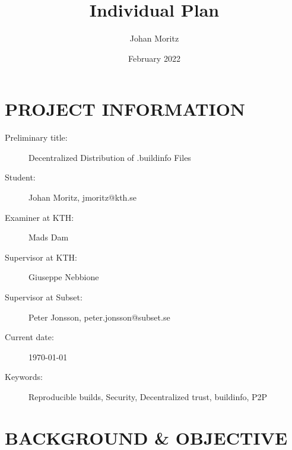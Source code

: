 \documentclass{article}
\title{Individual Plan}
\author{Johan Moritz}
\date{February 2022}
\begin{document}

\maketitle

\section*{PROJECT INFORMATION}

\begin{description}
	\item[Preliminary title:]  Decentralized Distribution of .buildinfo Files
	\item[Student:]  Johan Moritz, jmoritz@kth.se
	\item[Examiner at KTH:]  Mads Dam
	\item[Supervisor at KTH:]  Giuseppe Nebbione
	\item[Supervisor at Subset:]  Peter Jonsson, peter.jonsson@subset.se
	\item[Current date:]  \today
	\item[Keywords:]  Reproducible builds, Security, Decentralized trust, buildinfo, P2P 
\end{description}

\section*{BACKGROUND \& OBJECTIVE}
\end{document}
